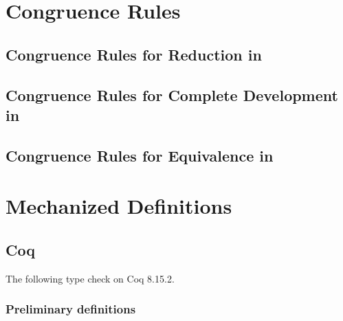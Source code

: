 \chapter{Congruence Rules} \label{app:cong}



\iffalse
The following two sections contain the full congruence rules for
the congruent closure of reduction in \lang,
and for equivalence in \CICE.
The shorthand rules \rref*{red-cong} and \rref*{equiv-cong} can then be proven
as theorems by induction on the respective congruence rules.
\fi

\section{Congruence Rules for Reduction in \lang} \label{app:cong:red}


\section{Congruence Rules for Complete Development in \lang} \label{app:cong:develop}

\vfill %

\section{Congruence Rules for Equivalence in \CICE} \label{app:cong:equiv}


\chapter{Mechanized \CICE Definitions} \label{app:mechanization}

\setmonofont{iosevka.ttc}

\section{Coq}

The following type check on Coq 8.15.2.

\subsection{Preliminary definitions} \label{app:mechanization:coq:prelim}

